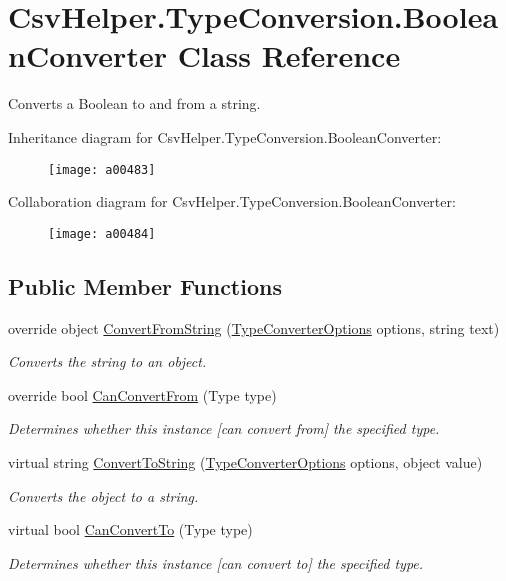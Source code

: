 \hypertarget{a00045}{\section{Csv\-Helper.\-Type\-Conversion.\-Boolean\-Converter Class Reference}
\label{a00045}
}


Converts a Boolean to and from a string.  




Inheritance diagram for Csv\-Helper.\-Type\-Conversion.\-Boolean\-Converter\-:
\nopagebreak
\begin{figure}[H]
\begin{center}
\leavevmode
\texttt{[image: a00483]}
\end{center}
\end{figure}


Collaboration diagram for Csv\-Helper.\-Type\-Conversion.\-Boolean\-Converter\-:
\nopagebreak
\begin{figure}[H]
\begin{center}
\leavevmode
\texttt{[image: a00484]}
\end{center}
\end{figure}
\subsection*{Public Member Functions}
\begin{DoxyCompactItemize}
\item 
override object \hyperlink{a00045_abc77c631974272fd1dfe3fe4fcc3bf28}{Convert\-From\-String} (\hyperlink{a00158}{Type\-Converter\-Options} options, string text)
\begin{DoxyCompactList}\small\item\em Converts the string to an object. \end{DoxyCompactList}\item 
override bool \hyperlink{a00045_a0be20573af4ee53409bb437125a64268}{Can\-Convert\-From} (Type type)
\begin{DoxyCompactList}\small\item\em Determines whether this instance \mbox{[}can convert from\mbox{]} the specified type. \end{DoxyCompactList}\item 
virtual string \hyperlink{a00086_a36cb2f9b24f15a671293f3a722324c27}{Convert\-To\-String} (\hyperlink{a00158}{Type\-Converter\-Options} options, object value)
\begin{DoxyCompactList}\small\item\em Converts the object to a string. \end{DoxyCompactList}\item 
virtual bool \hyperlink{a00086_acb65bd8c8199d88d5b1629ae35d18514}{Can\-Convert\-To} (Type type)
\begin{DoxyCompactList}\small\item\em Determines whether this instance \mbox{[}can convert to\mbox{]} the specified type. \end{DoxyCompactList}\end{DoxyCompactItemize}



